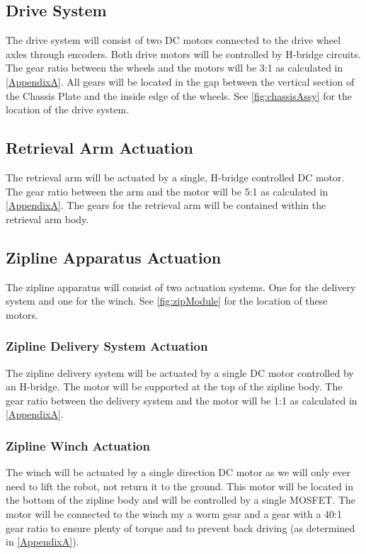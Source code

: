 \documentclass[11pt, oneside]{article} %
\begin{document}
	\subsection{Drive System}
	The drive system will consist of two DC motors connected to the drive wheel axles through encoders. Both drive motors will be controlled by H-bridge circuits. The gear ratio between the wheels and the motors will be 3:1 as calculated in \autoref{AppendixA}. All gears will be located in the gap between the vertical section of the Chassis Plate and the inside edge of the wheels. See \autoref{fig:chassisAssy} for the location of the drive system.
	
	\subsection{Retrieval Arm Actuation}
	The retrieval arm will be actuated by a single, H-bridge controlled DC motor. The gear ratio between the arm and the motor will be 5:1 as calculated in \autoref{AppendixA}. The gears for the retrieval arm will be contained within the retrieval arm body.
	
	\subsection{Zipline Apparatus Actuation}
	The zipline apparatus will consist of two actuation systems. One for the delivery system and one for the winch. See \autoref{fig:zipModule} for the location of these motors.
		
		\subsubsection{Zipline Delivery System Actuation}
		The zipline delivery system will be actuated by a single DC motor controlled by an H-bridge. The motor will be supported at the top of the zipline body. The gear ratio between the delivery system and the motor will be 1:1 as calculated in \autoref{AppendixA}.
		
		\subsubsection{Zipline Winch Actuation}
		The winch will be actuated by a single direction DC motor as we will only ever need to lift the robot, not return it to the ground. This motor will be located in the bottom of the zipline body and will be controlled by a single MOSFET. The motor will be connected to the winch my a worm gear and a gear with a 40:1 gear ratio to ensure plenty of torque and to prevent back driving (as determined in \autoref{AppendixA}).
\end{document}
